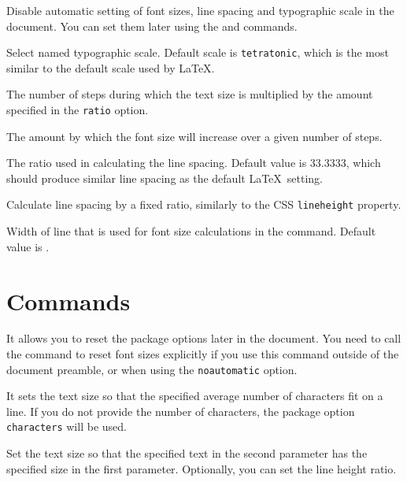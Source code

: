 \documentclass{ltxdoc}
\newcommand\StartDescribe[1]{%
  \par\medskip\noindent\DescribeMacro#1
}
\begin{document}
\noindent {}  Disable automatic setting of font sizes, line spacing and typographic scale in the document. You can set them 
later using the \cmd{\setsizes} and \cmd{\ResponsiveSetup} commands.

\noindent {} Select named typographic scale. Default scale is
\texttt{tetratonic}, which is the most similar to the default scale used by
\LaTeX.

\noindent {} The number of steps during which the text size is multiplied by the amount specified in the \texttt{ratio} option.

\noindent {} The amount by which the font size will increase over a given number of steps.

\noindent {} The ratio used in calculating the line spacing. Default value is 33.3333, which should produce similar line spacing as the default \LaTeX\ setting.

\noindent {} Calculate line spacing by a fixed ratio, similarly to the CSS \texttt{lineheight} property.

\noindent {} Width of line that is used for font size calculations in the \cmd{\setsizes} command. Default value is \cmd{\textwidth}.




\section{Commands}

\StartDescribe\ResponsiveSetup
\cmd\ResponsiveSetup{}

\noindent It allows you to reset the package options later in the document. You
need to call the \cmd{\setsizes} command to reset font sizes explicitly if you use this command
outside of the document preamble, or when using the \texttt{noautomatic} option.

\StartDescribe\setsizes
\cmd\setsizes{}

\noindent It sets the text size so that the specified average number of
characters fit on a line. If you do not provide the number of characters, the
package option \texttt{characters} will be used.


\StartDescribe\fonttobox
\cmd\fonttobox{}

\noindent Set the text size so that the specified text in the second parameter has
the specified size in the first parameter. Optionally, you can set the line
height ratio.
\end{document}
